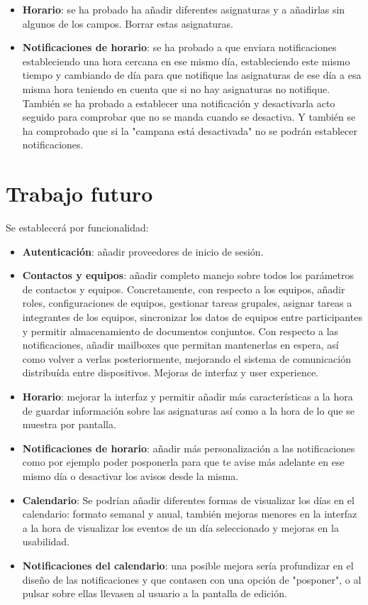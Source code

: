 \documentclass[a4paper,openright,12pt]{article}
\begin{document}
\begin{itemize}
    \item \textbf{Horario}: se ha probado ha añadir diferentes asignaturas y a añadirlas sin algunos de los campos. Borrar estas asignaturas. 
    
    \item \textbf{Notificaciones de horario}: se ha probado a que enviara notificaciones estableciendo una hora cercana en ese mismo día, estableciendo este mismo tiempo y cambiando de día para que notifique las asignaturas de ese día a esa misma hora teniendo en cuenta que si no hay asignaturas no notifique. También se ha probado a establecer una notificación y desactivarla acto seguido para comprobar que no se manda cuando se desactiva. Y también se ha comprobado que si la "campana está desactivada" no se podrán establecer notificaciones.

\end{itemize}
\section{Trabajo futuro}
Se establecerá por funcionalidad:
\begin{itemize}
    \item \textbf{Autenticación}: añadir proveedores de inicio de sesión.
    \item \textbf{Contactos y equipos}: añadir completo manejo sobre todos los parámetros de contactos y equipos. Concretamente, con respecto a los equipos, añadir roles, configuraciones de equipos, gestionar tareas grupales, asignar tareas a integrantes de los equipos, sincronizar los datos de equipos entre participantes y permitir almacenamiento de documentos conjuntos. Con respecto a las notificaciones, añadir mailboxes que permitan mantenerlas en espera, así como volver a verlas posteriormente, mejorando el sistema de comunicación distribuída entre dispositivos. Mejoras de interfaz y user experience.
    
    \item \textbf{Horario}: mejorar la interfaz y permitir añadir más características a la hora de guardar información sobre las asignaturas así como a la hora de lo que se muestra por pantalla. 
    
    \item \textbf{Notificaciones de horario}: añadir más personalización a las notificaciones como por ejemplo poder posponerla para que te avise más adelante en ese mismo día o desactivar los avisos desde la misma.
    
    \item \textbf{Calendario}: Se podrían añadir diferentes formas de visualizar los días en el calendario: formato semanal y anual, también mejoras menores en la interfaz a la hora de visualizar los eventos de un día seleccionado y mejoras en la usabilidad.
    
    \item \textbf{Notificaciones del calendario}: una posible mejora sería profundizar en el diseño de las notificaciones y que contasen con una opción de "posponer", o al pulsar sobre ellas llevasen al usuario a la pantalla de edición.
    
    
\end{itemize}
\end{document}
